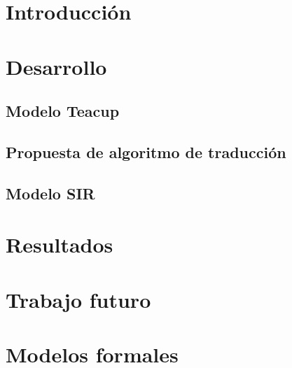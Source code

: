 \documentclass[11pt, a4paper]{article}
\begin{document}

\maketitle
\newpage

\tableofcontents
\newpage

%
\section{Introducción}


\section{Desarrollo}

\subsection{Modelo Teacup}

\subsection{Propuesta de algoritmo de traducción}


\subsection{Modelo SIR}


\section{Resultados}


\section{Trabajo futuro}


\appendix

\section{Modelos formales}


%
% 
%
\end{document}

